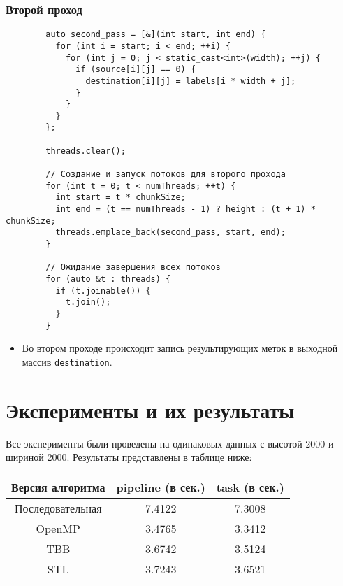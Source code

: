 \documentclass[a4paper, 14pt]{article}
\begin{document}
        \newpage
        \subsubsection*{\centering Второй проход}
        
        \begin{verbatim}
        auto second_pass = [&](int start, int end) {
          for (int i = start; i < end; ++i) {
            for (int j = 0; j < static_cast<int>(width); ++j) {
              if (source[i][j] == 0) {
                destination[i][j] = labels[i * width + j];
              }
            }
          }
        };
        
        threads.clear();
        
        // Создание и запуск потоков для второго прохода
        for (int t = 0; t < numThreads; ++t) {
          int start = t * chunkSize;
          int end = (t == numThreads - 1) ? height : (t + 1) * chunkSize;
          threads.emplace_back(second_pass, start, end);
        }
        
        // Ожидание завершения всех потоков
        for (auto &t : threads) {
          if (t.joinable()) {
            t.join();
          }
        }
        \end{verbatim}
        
        \begin{itemize}
          \item Во втором проходе происходит запись результирующих меток в выходной массив \texttt{destination}.
        \end{itemize}

	\newpage
	\section*{\centering Эксперименты и их результаты}

        Все эксперименты были проведены на одинаковых данных с высотой $2000$ и шириной $2000$. Результаты представлены в таблице ниже:

	\begin{center}
		\begin{tabular}{ ||c | c | c ||  }
			\hline Версия алгоритма & pipeline (в сек.) & task (в сек.)\\ 
			\hline Последовательная & 7.4122 & 7.3008 \\
			\hline OpenMP & 3.4765 & 3.3412 \\
			\hline TBB & 3.6742 & 3.5124 \\ 
			\hline STL & 3.7243 & 3.6521 \\ 
			\hline
		\end{tabular}\\[5mm]
	\end{center}
\end{document}
